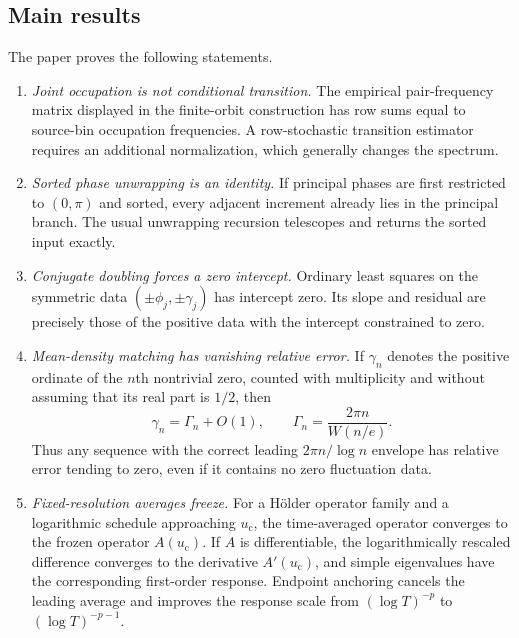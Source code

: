 \documentclass[11pt]{article}
\theoremstyle{definition}
\theoremstyle{remark}
\newcommand{\uc}{u_{\mathrm c}}
\begin{document}
\subsection*{Main results}

The paper proves the following statements.

\begin{enumerate}[label=\textbf{R\arabic*.},leftmargin=3.2em]
    \item \emph{Joint occupation is not conditional transition.}  The empirical pair-frequency matrix displayed in the finite-orbit construction has row sums equal to source-bin occupation frequencies.  A row-stochastic transition estimator requires an additional normalization, which generally changes the spectrum.

    \item \emph{Sorted phase unwrapping is an identity.}  If principal phases are first restricted to $(0,\pi)$ and sorted, every adjacent increment already lies in the principal branch.  The usual unwrapping recursion telescopes and returns the sorted input exactly.

    \item \emph{Conjugate doubling forces a zero intercept.}  Ordinary least squares on the symmetric data $(\pm\phi_j,\pm\gamma_j)$ has intercept zero.  Its slope and residual are precisely those of the positive data with the intercept constrained to zero.

    \item \emph{Mean-density matching has vanishing relative error.}  If $\gamma_n$ denotes the positive ordinate of the $n$th nontrivial zero, counted with multiplicity and without assuming that its real part is $1/2$, then
    \[
        \gamma_n=\Gamma_n+O(1),
        \qquad
        \Gamma_n=\frac{2\pi n}{W(n/e)}.
    \]
    Thus any sequence with the correct leading $2\pi n/\log n$ envelope has relative error tending to zero, even if it contains no zero fluctuation data.

    \item \emph{Fixed-resolution averages freeze.}  For a H\"older operator family and a logarithmic schedule approaching $\uc$, the time-averaged operator converges to the frozen operator $A(\uc)$.  If $A$ is differentiable, the logarithmically rescaled difference converges to the derivative $A'(\uc)$, and simple eigenvalues have the corresponding first-order response.  Endpoint anchoring cancels the leading average and improves the response scale from $(\log T)^{-p}$ to $(\log T)^{-p-1}$.


\end{enumerate}
\end{document}
